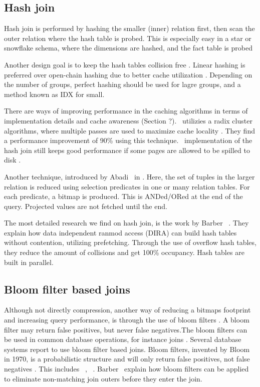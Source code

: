 \subsection{Hash join}
\label{sub:Hash join}
Hash join is performed by hashing the smaller (inner) relation first, then scan the outer relation where the hash table is probed. This is especially easy in a star or snowflake schema, where the dimensions are hashed, and the fact table is probed \cite{Barber2012-xt, Raman2013-em}

Another design goal is to keep the hash tables collision free \cite{Raman2013-em, Raman2008-gi}. Linear hashing is preferred over open-chain hashing due to better cache utilization \cite{Raman2008-gi}. Depending on the number of groups, perfect hashing should be used for lagre groups, and a method known as IDX for small.

There are ways of improving performance in the caching algorithms in terms of implementation details and cache awareness (Section ?). \monetdb~utilizies a radix cluster algorithms, where multiple passes are used to maximize cache locality \cite{Boncz2002-yj}. They find a performance improvement of 90\% using this technique. \mssql~implementation of the hash join still keeps good performance if some pages are allowed to be spilled to disk \cite{Larson2013-mc}. 

Another technique, introduced by Abadi \ea~in  \cite{Abadi2008-dd}. Here, the set of tuples in the larger relation is reduced using selection predicates in one or many relation tables. For each predicate, a bitmap is produced. This is ANDed/ORed at the end of the query. Projected values are not fetched until the end. 

The most detailed research we find on hash join, is the work by Barber \ea~\cite{Barber2014-ey}. They explain how data independent ranmod access (DIRA) can build hash tables without contention, utilizing prefetching. Through the use of overflow hash tables, they reduce the amount of collisions and get 100\% occupancy. Hash tables are built in parallel.


\subsection{Bloom filter based joins}
\label{sub:Bloom filter based joins}
Although not directly compression, another way of reducing a bitmaps footprint and increasing query performance, is through the use of bloom filters \cite{Bloom1970-nr}. A bloom filter may return false positives, but never false negatives.The bloom filters can be used in common database operations, for instance joins \cite{x} . Several database systems report to use bloom filter based joins. Bloom filters, invented by Bloom in 1970, is a probabilistic structure and will only return false positives, not false negatives \cite{Bloom1970-nr}. This includes \oracle~\cite{Lahiri2015-mz}, \ibm~\cite{Raman2013-em}. Barber \ea~explain how bloom filters can be applied to eliminate non-matching join outers before they enter the join.

